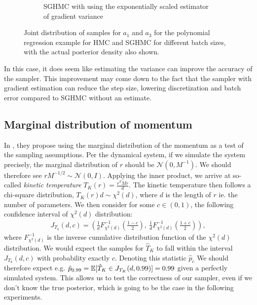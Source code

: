 \begin{figure}[htbp]
\begin{subfigure}[t]{0.45\linewidth}
        \caption{SGHMC with using the exponentially scaled estimator of gradient variance}
    \end{subfigure}
    \caption{Joint distribution of samples for $a_1$ and $a_3$ for the polynomial regression example for HMC and SGHMC for different batch sizes, with the actual posterior density also shown.}
    \label{fig:simualted_var_est_joint_comp}
\end{figure}
In this case, it does seem like estimating the variance can improve the accuracy of the sampler.
This improvement may come down to the fact that the sampler with gradient estimation can reduce the step size, lowering discretization and batch error compared to SGHMC without an estimate. 

\subsection{Marginal distribution of momentum}

In \cite{wenzel_how_2020}, they propose using the marginal distribution of the momentum as a test of the sampling assumptions. 
Per the dynamical system, if we simulate the system precisely, the marginal distribution of $r$ should be $\mathcal{N}(0, M^{-1})$. 
We should therefore see $r M^{-1/2} \sim \mathcal{N}(0, I)$. 
Applying the inner product, we arrive at so-called \emph{kinetic temperature} $T_K(r) = \frac{r^T M r}{d}$.
The kinetic temperature then follows a chi-square distribution, $T_K(r)d\sim \chi^2(d)$, where $d$ is the length of $r$ ie. the number of parameters. 
We then consider for some $c\in (0, 1)$, the following confidence interval of  $\chi^2(d)$ distribution:
\begin{align}
    J_{T_k}(d, c) = \left(\frac{1}{d} F_{\chi^2(d)}^{-1}\left( \frac{1-c}{2} \right),~\frac{1}{d} F_{\chi^2(d)}^{-1}\left(\frac{1+c}{2}\right)\right),
\end{align}
where $F_{\chi^2(d)}^{-1}$ is the inverse cumulative distribution function of the $\chi^2(d)$ distribution.
We would expect the samples for $\hat{T}_K$ to fall within the interval $J_{T_k}(d, c)$ with probability exactly $c$. 
Denoting this statistic $\hat{p}_{c}$
We should therefore expect e.g. $\hat{p}_{0.99}=\operatorname{\mathbb{E}}[\hat{T}_K \in J_{T_K}(d, {0.99})] = 0.99$ given a perfectly simulated system.
This allows us to test the correctness of our sampler, even if we don't know the true posterior, which is going to be the case in the following experiments.

